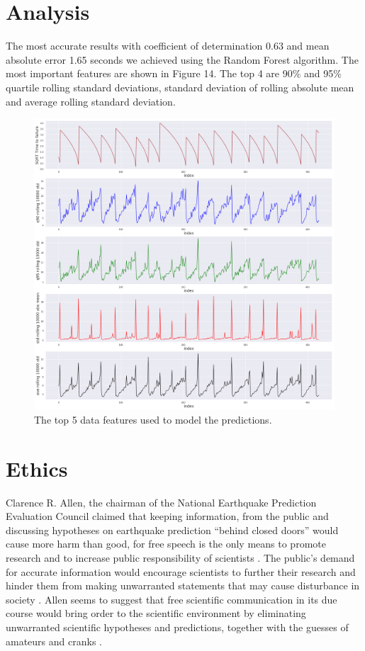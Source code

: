 \documentclass[]{llncs} %
\begin{document}
\section{Analysis}
The most accurate results with coefficient of determination 0.63 and mean absolute error 1.65 seconds we achieved using the Random Forest algorithm. The most important features are shown in Figure 14. The top 4 are 90\% and 95\% quartile rolling standard deviations, standard deviation of rolling absolute mean and average rolling standard deviation.
\begin{figure}[H]
	\centering
	\includegraphics[width=1\linewidth]{analysis}
	\caption{The top 5 data features used to model the predictions.}
	\label{fig:analysis}
\end{figure}

\clearpage
\newpage

\section{Ethics}

Clarence R. Allen, the chairman of the National Earthquake Prediction Evaluation Council claimed that keeping information, from the public and discussing hypotheses on earthquake prediction “behind closed doors” would cause more harm than good, for free speech is the only means to promote research and to increase public responsibility of scientists \cite{Ayhan}. The public’s demand for accurate information would encourage scientists to further their research and hinder them from making unwarranted statements that may cause disturbance in society \cite{Ayhan}. Allen seems to suggest that free scientific communication in its due course would bring order to the scientific environment by eliminating unwarranted scientific hypotheses and predictions, together with the guesses of amateurs and cranks \cite{Ayhan}. \par 
\end{document}
